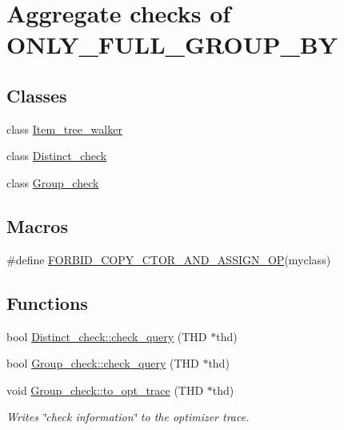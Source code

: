 \hypertarget{group__AGGREGATE__CHECKS}{}\section{Aggregate checks of O\+N\+L\+Y\+\_\+\+F\+U\+L\+L\+\_\+\+G\+R\+O\+U\+P\+\_\+\+BY}
\label{group__AGGREGATE__CHECKS}
\subsection*{Classes}
\begin{DoxyCompactItemize}
\item 
class \mbox{\hyperlink{classItem__tree__walker}{Item\+\_\+tree\+\_\+walker}}
\item 
class \mbox{\hyperlink{classDistinct__check}{Distinct\+\_\+check}}
\item 
class \mbox{\hyperlink{classGroup__check}{Group\+\_\+check}}
\end{DoxyCompactItemize}
\subsection*{Macros}
\begin{DoxyCompactItemize}
\item 
\#define \mbox{\hyperlink{group__AGGREGATE__CHECKS_ga69e57fec296941e565db230b184262ec}{F\+O\+R\+B\+I\+D\+\_\+\+C\+O\+P\+Y\+\_\+\+C\+T\+O\+R\+\_\+\+A\+N\+D\+\_\+\+A\+S\+S\+I\+G\+N\+\_\+\+OP}}(myclass)
\end{DoxyCompactItemize}
\subsection*{Functions}
\begin{DoxyCompactItemize}
\item 
bool \mbox{\hyperlink{group__AGGREGATE__CHECKS_ga83e75b415b78e10ade375ad320ea446c}{Distinct\+\_\+check\+::check\+\_\+query}} (T\+HD $\ast$thd)
\item 
bool \mbox{\hyperlink{group__AGGREGATE__CHECKS_ga85f98a122e6f9accf528534acb5db686}{Group\+\_\+check\+::check\+\_\+query}} (T\+HD $\ast$thd)
\item 
\mbox{\label{group__AGGREGATE__CHECKS_ga97e11f17193e6ad1adff12b0ff2c3af6}} 
void \mbox{\hyperlink{group__AGGREGATE__CHECKS_ga97e11f17193e6ad1adff12b0ff2c3af6}{Group\+\_\+check\+::to\+\_\+opt\+\_\+trace}} (T\+HD $\ast$thd)
\begin{DoxyCompactList}\small\item\em Writes \char`\"{}check information\char`\"{} to the optimizer trace. \end{DoxyCompactList}\end{DoxyCompactItemize}


